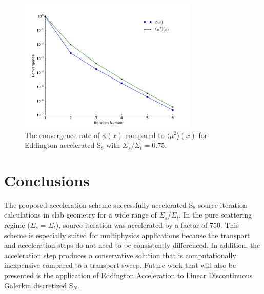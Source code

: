 \documentclass{anstrans}
\newcommand{\SN}{S$_N$\xspace}
\newcommand{\edd}{\langle \mu^2 \rangle}
\begin{document}
	\begin{figure}
		\centering
		\includegraphics[width=8.5cm]{eddCon_mu.pdf}
		\caption{The convergence rate of $\phi(x)$ compared to $\edd(x)$ for Eddington accelerated S$_8$ with $\Sigma_s/\Sigma_t = 0.75$. }
		\label{fig:conv_edd}
	\end{figure}


\section{Conclusions}
	The proposed acceleration scheme successfully accelerated S$_8$ source iteration calculations in slab geometry for a wide range of $\Sigma_s/\Sigma_t$. In the pure scattering regime ($\Sigma_s = \Sigma_t$), source iteration was accelerated by a factor of 750. This scheme is especially suited for multiphysics applications because the transport and acceleration steps do not need to be consistently differenced. In addition, the acceleration step produces a conservative solution that is computationally inexpensive compared to a transport sweep. Future work that will also be presented is the application of Eddington Acceleration to Linear Discontinuous Galerkin discretized \SN. 




\end{document}
